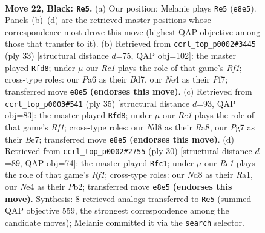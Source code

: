 \documentclass[11pt]{article}
\begin{document}
\clearpage

\begin{figure}[p]\centering
\begin{subfigure}{0.46\textwidth}\centering
\resizebox{\linewidth}{!}{%
\newchessgame
\chessboard[
  setfen={1rbnrk2/1ppp1ppp/p2q4/B2P4/4n2N/4P1P1/PP2RP1P/1R1Q1BK1 b - - 20 22},
  showmover=false,
  pgfstyle=straightmove, color=movearrow, markmove={e8-e5}
]}
\caption{}
\end{subfigure}\hfill
\begin{subfigure}{0.46\textwidth}\centering
\resizebox{\linewidth}{!}{%
\newchessgame
\chessboard[
  setfen={r4rk1/3b1ppp/pp1pp3/2q1n3/2P1P3/P1N4P/1P1Q1PP1/R3RBK1 b - - 2 17},
  showmover=false,
  pgfstyle=straightmove, color=movearrow, markmove={f8-d8}
]}
\caption{}
\end{subfigure}
\\[4pt]
\begin{subfigure}{0.46\textwidth}\centering
\resizebox{\linewidth}{!}{%
\newchessgame
\chessboard[
  setfen={r4rk1/1p2bppp/p3p3/Pqp5/3n1B2/3P2PP/1PP2PB1/R2Q1RK1 b - - 6 18},
  showmover=false,
  pgfstyle=straightmove, color=movearrow, markmove={f8-d8}
]}
\caption{}
\end{subfigure}\hfill
\begin{subfigure}{0.46\textwidth}\centering
\resizebox{\linewidth}{!}{%
\newchessgame
\chessboard[
  setfen={r1b2rk1/pp2qpb1/2p1p1p1/7p/3PQ2P/1B2PN2/PP3PP1/R4RK1 w - - 0 16},
  showmover=false,
  pgfstyle=straightmove, color=movearrow, markmove={f1-c1}
]}
\caption{}
\end{subfigure}
\caption{\textbf{Move 22, Black: \texttt{Re5}.} (a) Our position; Melanie plays \texttt{Re5} (\texttt{e8e5}). Panels (b)--(d) are the retrieved master positions whose correspondence most drove this move (highest QAP objective among those that transfer to it). (b) Retrieved from \texttt{ccrl\_top\_p0002\#3445} (ply 33) [structural distance $d$=75, QAP obj=102]: the master played \texttt{Rfd8}; under $\mu$ our \emph{Re1} plays the role of that game's \emph{Rf1}; cross-type roles: our \emph{P}a6 as their \emph{B}d7, our \emph{N}e4 as their \emph{P}f7; transferred move \texttt{e8e5} \textbf{(endorses this move)}. (c) Retrieved from \texttt{ccrl\_top\_p0003\#541} (ply 35) [structural distance $d$=93, QAP obj=83]: the master played \texttt{Rfd8}; under $\mu$ our \emph{Re1} plays the role of that game's \emph{Rf1}; cross-type roles: our \emph{N}d8 as their \emph{R}a8, our \emph{P}g7 as their \emph{B}e7; transferred move \texttt{e8e5} \textbf{(endorses this move)}. (d) Retrieved from \texttt{ccrl\_top\_p0002\#2755} (ply 30) [structural distance $d$=89, QAP obj=74]: the master played \texttt{Rfc1}; under $\mu$ our \emph{Re1} plays the role of that game's \emph{Rf1}; cross-type roles: our \emph{N}d8 as their \emph{R}a1, our \emph{N}e4 as their \emph{P}b2; transferred move \texttt{e8e5} \textbf{(endorses this move)}. Synthesis: 8 retrieved analogs transferred to \texttt{Re5} (summed QAP objective 559, the strongest correspondence among the candidate moves); Melanie committed it via the \texttt{search} selector.}
\label{fig:thought-m43}
\end{figure}
\end{document}

